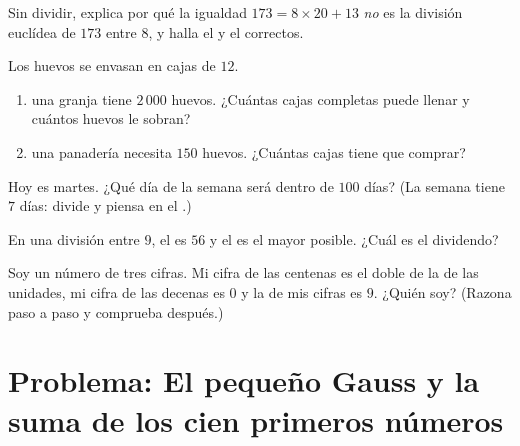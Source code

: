 \begin{exercise}[$\star$]\label{exo:g6:wholes:8}
Sin dividir, explica por qué la igualdad $173 = 8 \times 20 + 13$ \emph{no} es
la división euclídea de $173$ entre $8$, y halla el
 y el  correctos.
\end{exercise}

\begin{exercise}[$\star\star$]\label{exo:g6:wholes:9}
Los huevos se envasan en cajas de $12$.
\begin{enumerate}
  \item una granja tiene $2\,000$ huevos. ¿Cuántas cajas completas puede llenar y
        cuántos huevos le sobran?
  \item una panadería necesita $150$ huevos. ¿Cuántas cajas tiene que comprar?
\end{enumerate}
\end{exercise}

\begin{exercise}[$\star\star$]\label{exo:g6:wholes:10}
Hoy es martes. ¿Qué día de la semana será dentro de $100$ días?
(La semana tiene $7$ días: divide y piensa en el .)
\end{exercise}

\begin{exercise}[$\star\star$]\label{exo:g6:wholes:11}
En una división entre $9$, el  es $56$ y el  es el
mayor posible. ¿Cuál es el dividendo?
\end{exercise}

\begin{exercise}[$\star\star\star$]\label{exo:g6:wholes:12}
Soy un número de tres cifras. Mi cifra de las centenas es el doble de la de las unidades,
mi cifra de las decenas es $0$ y la  de mis cifras es $9$. ¿Quién soy?
(Razona paso a paso y comprueba después.)
\end{exercise}

\section{Problema: El pequeño Gauss y la suma de los cien primeros
números}

